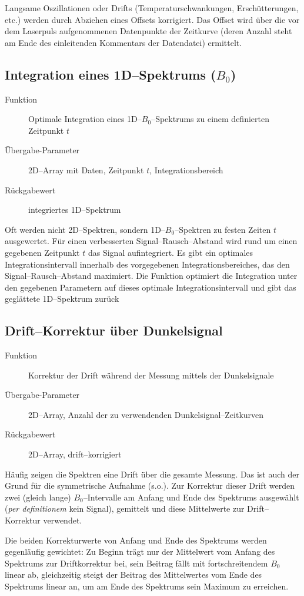 \documentclass{article}
\begin{document}
Langsame Oszillationen oder Drifts (Temperaturschwankungen, Erschütterungen, etc.)
werden durch Abziehen eines Offsets korrigiert. Das Offset wird über die vor dem
Laserpuls aufgenommenen Datenpunkte der Zeitkurve (deren Anzahl steht am Ende
des einleitenden Kommentars der Datendatei) ermittelt.


\subsection{Integration eines 1D--Spektrums ($B_0$)}

\begin{description}
  \item[Funktion] Optimale Integration eines 1D--$B_0$--Spektrums zu einem
  definierten Zeitpunkt $t$
  \item[Übergabe-Parameter] 2D--Array mit Daten, Zeitpunkt $t$, Integrationsbereich
  \item[Rückgabewert] integriertes 1D--Spektrum
\end{description}

Oft werden nicht 2D--Spektren, sondern 1D--$B_0$--Spektren zu festen Zeiten $t$ 
ausgewertet. Für einen verbesserten Signal--Rausch--Abstand wird rund um einen 
gegebenen Zeitpunkt $t$ das Signal aufintegriert. Es gibt ein optimales 
Integrationsintervall innerhalb des vorgegebenen Integrationsbereiches, das den 
Signal--Rausch--Abstand maximiert. Die Funktion optimiert die Integration unter 
den gegebenen Parametern auf dieses optimale Integrationsintervall und gibt das 
geglättete 1D--Spektrum zurück


\subsection{Drift--Korrektur über Dunkelsignal}

\begin{description}
  \item[Funktion] Korrektur der Drift während der Messung mittels der Dunkelsignale
  \item[Übergabe-Parameter] 2D--Array, Anzahl der zu verwendenden 
  Dunkelsignal--Zeitkurven
  \item[Rückgabewert] 2D--Array, drift--korrigiert
\end{description}

Häufig zeigen die Spektren eine Drift über die gesamte Messung. Das ist auch der
Grund für die symmetrische Aufnahme (s.o.). Zur Korrektur dieser Drift werden
zwei (gleich lange) $B_0$--Intervalle am Anfang und Ende des Spektrums
ausgewählt (\emph{per definitionem} kein Signal), gemittelt und diese
Mittelwerte zur Drift--Korrektur verwendet.

Die beiden Korrekturwerte von Anfang und Ende des Spektrums werden gegenläufig
gewichtet: Zu Beginn trägt nur der Mittelwert vom Anfang des Spektrums zur
Driftkorrektur bei, sein Beitrag fällt mit fortschreitendem $B_0$ linear ab,
gleichzeitig steigt der Beitrag des Mittelwertes vom Ende des Spektrums linear
an, um am Ende des Spektrums sein Maximum zu erreichen.
\end{document}
